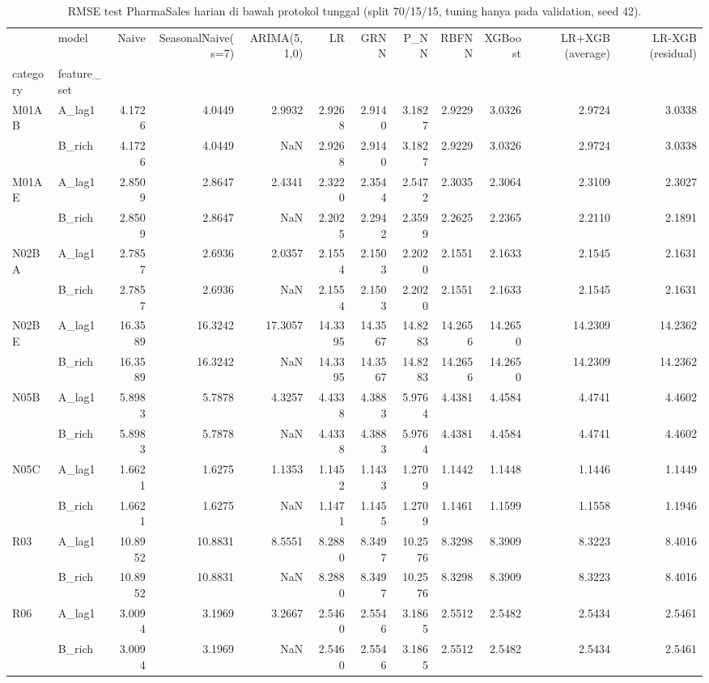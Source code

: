 \begin{table}
\caption{RMSE test PharmaSales harian di bawah protokol tunggal (split 70/15/15, tuning hanya pada validation, seed 42).}
\label{tab:tab1_pharma_daily_rmse}
\begin{tabular}{llrrrrrrrrrr}
\toprule
 & model & Naive & SeasonalNaive(s=7) & ARIMA(5,1,0) & LR & GRNN & P\_NN & RBFNN & XGBoost & LR+XGB (average) & LR-XGB (residual) \\
category & feature_set &  &  &  &  &  &  &  &  &  &  \\
\midrule
\multirow[t]{2}{*}{M01AB} & A\_lag1 & 4.1726 & 4.0449 & 2.9932 & 2.9268 & 2.9140 & 3.1827 & 2.9229 & 3.0326 & 2.9724 & 3.0338 \\
 & B\_rich & 4.1726 & 4.0449 & NaN & 2.9268 & 2.9140 & 3.1827 & 2.9229 & 3.0326 & 2.9724 & 3.0338 \\
\cline{1-12}
\multirow[t]{2}{*}{M01AE} & A\_lag1 & 2.8509 & 2.8647 & 2.4341 & 2.3220 & 2.3544 & 2.5472 & 2.3035 & 2.3064 & 2.3109 & 2.3027 \\
 & B\_rich & 2.8509 & 2.8647 & NaN & 2.2025 & 2.2942 & 2.3599 & 2.2625 & 2.2365 & 2.2110 & 2.1891 \\
\cline{1-12}
\multirow[t]{2}{*}{N02BA} & A\_lag1 & 2.7857 & 2.6936 & 2.0357 & 2.1554 & 2.1503 & 2.2020 & 2.1551 & 2.1633 & 2.1545 & 2.1631 \\
 & B\_rich & 2.7857 & 2.6936 & NaN & 2.1554 & 2.1503 & 2.2020 & 2.1551 & 2.1633 & 2.1545 & 2.1631 \\
\cline{1-12}
\multirow[t]{2}{*}{N02BE} & A\_lag1 & 16.3589 & 16.3242 & 17.3057 & 14.3395 & 14.3567 & 14.8283 & 14.2656 & 14.2650 & 14.2309 & 14.2362 \\
 & B\_rich & 16.3589 & 16.3242 & NaN & 14.3395 & 14.3567 & 14.8283 & 14.2656 & 14.2650 & 14.2309 & 14.2362 \\
\cline{1-12}
\multirow[t]{2}{*}{N05B} & A\_lag1 & 5.8983 & 5.7878 & 4.3257 & 4.4338 & 4.3883 & 5.9764 & 4.4381 & 4.4584 & 4.4741 & 4.4602 \\
 & B\_rich & 5.8983 & 5.7878 & NaN & 4.4338 & 4.3883 & 5.9764 & 4.4381 & 4.4584 & 4.4741 & 4.4602 \\
\cline{1-12}
\multirow[t]{2}{*}{N05C} & A\_lag1 & 1.6621 & 1.6275 & 1.1353 & 1.1452 & 1.1433 & 1.2709 & 1.1442 & 1.1448 & 1.1446 & 1.1449 \\
 & B\_rich & 1.6621 & 1.6275 & NaN & 1.1471 & 1.1455 & 1.2709 & 1.1461 & 1.1599 & 1.1558 & 1.1946 \\
\cline{1-12}
\multirow[t]{2}{*}{R03} & A\_lag1 & 10.8952 & 10.8831 & 8.5551 & 8.2880 & 8.3497 & 10.2576 & 8.3298 & 8.3909 & 8.3223 & 8.4016 \\
 & B\_rich & 10.8952 & 10.8831 & NaN & 8.2880 & 8.3497 & 10.2576 & 8.3298 & 8.3909 & 8.3223 & 8.4016 \\
\cline{1-12}
\multirow[t]{2}{*}{R06} & A\_lag1 & 3.0094 & 3.1969 & 3.2667 & 2.5460 & 2.5546 & 3.1865 & 2.5512 & 2.5482 & 2.5434 & 2.5461 \\
 & B\_rich & 3.0094 & 3.1969 & NaN & 2.5460 & 2.5546 & 3.1865 & 2.5512 & 2.5482 & 2.5434 & 2.5461 \\
\cline{1-12}
\bottomrule
\end{tabular}
\end{table}

